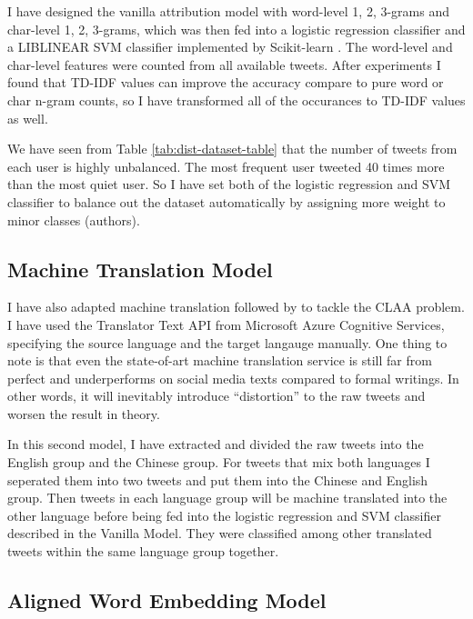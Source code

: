 \documentclass[11pt,a4paper]{article}
\begin{document}
I have designed the vanilla attribution model with word-level 1, 2, 3-grams and char-level 1, 2, 3-grams, which was then fed into a logistic regression classifier and a LIBLINEAR SVM classifier \cite{REF08a} implemented by Scikit-learn \cite{scikit-learn}. The word-level and char-level features were counted from all available tweets. After experiments I found that TD-IDF values can improve the accuracy compare to pure word or char n-gram counts, so I have transformed all of the occurances to TD-IDF values as well.

We have seen from Table \ref{tab:dist-dataset-table} that the number of tweets from each user is highly unbalanced. The most frequent user tweeted 40 times more than the most quiet user. So I have set both of the logistic regression and SVM classifier to balance out the dataset automatically by assigning more weight to minor classes (authors).

\subsection{Machine Translation Model}

I have also adapted machine translation followed by \citet{bogdanova2014cross} to tackle the CLAA problem. I have used the Translator Text API from Microsoft Azure Cognitive Services, specifying the source language and the target langauge manually. One thing to note is that even the state-of-art machine translation service is still far from perfect and underperforms on social media texts compared to formal writings. In other words, it will inevitably introduce ``distortion'' to the raw tweets and worsen the result in theory.

In this second model, I have extracted and divided the raw tweets into the English group and the Chinese group. For tweets that mix both languages I seperated them into two tweets and put them into the Chinese and English group. Then tweets in each language group will be machine translated into the other language before being fed into the logistic regression and SVM classifier described in the Vanilla Model. They were classified among other translated tweets within the same language group together.

\subsection{Aligned Word Embedding Model}
\end{document}
